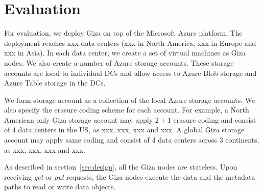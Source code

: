 \section{Evaluation}


For evaluation, we deploy Giza on top of the Microsoft Azure platform. The deployment reaches xxx data centers (xxx in North America, xxx in Europe and xxx in Asia). In each data center, we create a set of virtual machines as Giza nodes. We also create a number of Azure storage accounts. These storage accounts are local to individual DCs and allow access to Azure Blob storage and Azure Table storage in the DCs.

We form \name storage account as a collection of the local Azure storage accounts. We also specify the erasure coding scheme for each account. For example, a North American only Giza storage account may apply $2+1$ erasure coding and consist of 4 data centers in the US, as xxx, xxx, xxx and xxx. A global Giza storage account may apply same coding and consist of 4 data centers across 3 continents, as xxx, xxx, xxx and xxx.

As described in section~\ref{sec:design}, all the Giza nodes are stateless. Upon receiving {\em get} or {\em put} requests, the Giza nodes execute the data and the metadata paths to read or write data objects.


